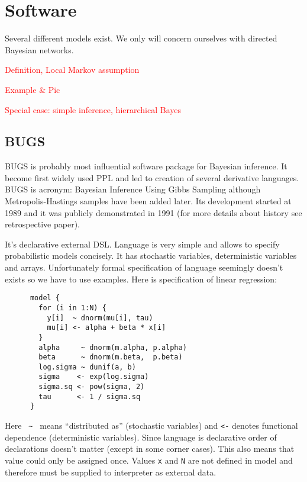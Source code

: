 \documentclass[a4paper]{article}
\newcommand{\FIXME}[1]{\textcolor{red}{#1}}
\begin{document}
\section{Software}

Several different models exist. We only will concern ourselves with directed
Bayesian networks.

\FIXME{Definition, Local Markov assumption}

\FIXME{Example \& Pic}

\FIXME{Special case: simple inference, hierarchical Bayes}



\subsection{BUGS}

BUGS\cite{gilks1994language} is probably most influential software package for
Bayesian inference. It become first widely used PPL and led to creation of
several derivative languages. BUGS is acronym: Bayesian Inference Using Gibbs
Sampling although Metropolis-Hastings samples have been added later. Its
development started at 1989 and it was publicly demonstrated in 1991 (for more
details about history see retrospective paper\cite{lunn2009bugs}).

It's declarative external DSL. Language is very simple and allows to specify
probabilistic models concisely. It has stochastic variables, deterministic
variables and arrays. Unfortunately formal specification of language seemingly
doesn't exists so we have to use examples. Here is specification of linear
regression:

\begin{verbatim}
      model {
        for (i in 1:N) {
          y[i]  ~ dnorm(mu[i], tau)
          mu[i] <- alpha + beta * x[i]
        }
        alpha     ~ dnorm(m.alpha, p.alpha)
        beta      ~ dnorm(m.beta,  p.beta)
        log.sigma ~ dunif(a, b)
        sigma    <- exp(log.sigma)
        sigma.sq <- pow(sigma, 2)
        tau      <- 1 / sigma.sq
      }
\end{verbatim}

Here \texttt{ \~ } means ``distributed as'' (stochastic variables) and \texttt{<-}
denotes functional dependence (deterministic variables). Since language is
declarative order of declarations doesn't matter (except in some corner cases).
This also means that value could only be assigned once. Values \texttt{x} and
\texttt{N} are not defined in model and therefore must be supplied to
interpreter as external data.
\end{document}
